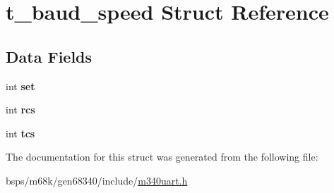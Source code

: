 \hypertarget{structt__baud__speed}{}\section{t\+\_\+baud\+\_\+speed Struct Reference}
\label{structt__baud__speed}
\subsection*{Data Fields}
\begin{DoxyCompactItemize}
\item 
\mbox{\label{structt__baud__speed_a4c4f5effff3ea6ba6143798bfd6108b1}} 
int {\bfseries set}
\item 
\mbox{\label{structt__baud__speed_a50f3a99a6f05b8c22276f2c121f20c83}} 
int {\bfseries rcs}
\item 
\mbox{\label{structt__baud__speed_ab3299e4e514bb669b51360ae42943dc5}} 
int {\bfseries tcs}
\end{DoxyCompactItemize}


The documentation for this struct was generated from the following file\+:\begin{DoxyCompactItemize}
\item 
bsps/m68k/gen68340/include/\mbox{\hyperlink{m340uart_8h}{m340uart.\+h}}\end{DoxyCompactItemize}
